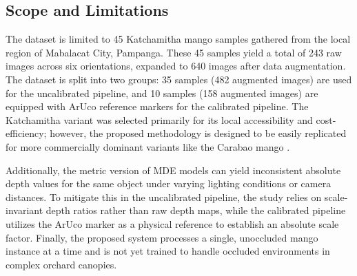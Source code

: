 \subsection{Scope and Limitations}
The dataset is limited to 45 Katchamitha mango samples gathered from the local
region of Mabalacat City, Pampanga. These 45 samples yield a total of 243 raw
images across six orientations, expanded to 640 images after data augmentation.
The dataset is split into two groups: 35 samples (482 augmented images) are used
for the uncalibrated pipeline, and 10 samples (158 augmented images) are equipped
with ArUco reference markers for the calibrated pipeline. The Katchamitha variant
was selected primarily for its local accessibility and cost-efficiency; however,
the proposed methodology is designed to be easily replicated for more commercially
dominant variants like the Carabao mango \cite{fernandez2017mango}.

Additionally, the metric version of MDE models can yield inconsistent absolute depth
values for the same object under varying lighting conditions or camera distances.
To mitigate this in the uncalibrated pipeline, the study relies on scale-invariant
depth ratios rather than raw depth maps, while the calibrated pipeline utilizes
the ArUco marker as a physical reference to establish an absolute scale factor.
Finally, the proposed system processes a single, unoccluded mango instance at a
time and is not yet trained to handle occluded environments in complex orchard
canopies.
